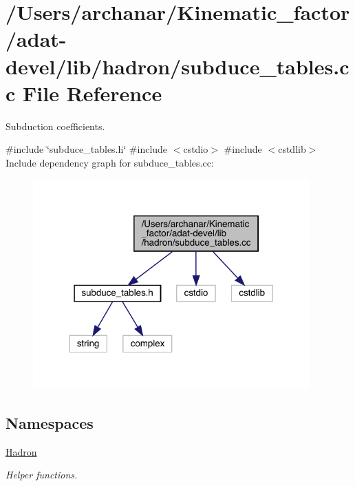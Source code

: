 \hypertarget{adat-devel_2lib_2hadron_2subduce__tables_8cc}{}\section{/\+Users/archanar/\+Kinematic\+\_\+factor/adat-\/devel/lib/hadron/subduce\+\_\+tables.cc File Reference}
\label{adat-devel_2lib_2hadron_2subduce__tables_8cc}


Subduction coefficients.  


{\ttfamily \#include \char`\"{}subduce\+\_\+tables.\+h\char`\"{}}\newline
{\ttfamily \#include $<$cstdio$>$}\newline
{\ttfamily \#include $<$cstdlib$>$}\newline
Include dependency graph for subduce\+\_\+tables.\+cc\+:
\nopagebreak
\begin{figure}[H]
\begin{center}
\leavevmode
\includegraphics[width=301pt]{d7/d93/adat-devel_2lib_2hadron_2subduce__tables_8cc__incl}
\end{center}
\end{figure}
\subsection*{Namespaces}
\begin{DoxyCompactItemize}
\item 
 \mbox{\hyperlink{namespaceHadron}{Hadron}}
\begin{DoxyCompactList}\small\item\em Helper functions. \end{DoxyCompactList}\end{DoxyCompactItemize}
